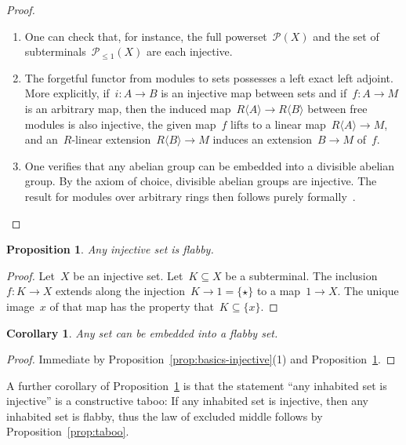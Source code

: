 \documentclass[oneside]{amsart}
\theoremstyle{definition}
\theoremstyle{plain}
\newtheorem{prop}[defn]{Proposition}
\newtheorem{cor}[defn]{Corollary}
\theoremstyle{remark}
\renewcommand{\P}{\mathcal{P}}
\renewcommand{\_}{\mathpunct{.}\,}
\begin{document}
\begin{proof}\begin{enumerate}
\item One can check that, for instance, the full powerset~$\P(X)$ and the set of
subterminals~$\P_{\leq 1}(X)$ are each injective.~\cite{XXX}
\item The forgetful functor from modules to sets possesses a left exact left
adjoint. More explicitly, if~$i : A \to B$ is an injective map between sets and
if~$f : A \to M$ is an arbitrary map, then the induced map~$R\langle A \rangle
\to R\langle B \rangle$ between free modules is also injective, the given
map~$f$ lifts to a linear map~$R\langle A \rangle \to M$, and an~$R$-linear
extension~$R\langle B \rangle \to M$ induces an extension~$B \to M$ of~$f$.
\item One verifies that any abelian group can be embedded into a divisible
abelian group. By the axiom of choice, divisible abelian groups are injective.
The result for modules over arbitrary rings then follows purely
formally~\cite{XXX}. \qedhere
\end{enumerate}\end{proof}

\begin{prop}\label{prop:injective-flabby}
Any injective set is flabby.\end{prop}

\begin{proof}Let~$X$ be an injective set. Let~$K \subseteq X$ be a subterminal.
The inclusion~$f : K \to X$ extends along the injection~$K \to 1 = \{\star\}$
to a map~$1 \to X$. The unique image~$x$ of that map has the property that~$K
\subseteq \{x\}$.\end{proof}

\begin{cor}\label{cor:enough-flabby-sets}
Any set can be embedded into a flabby set.\end{cor}

\begin{proof}Immediate by Proposition~\ref{prop:basics-injective}(1) and
Proposition~\ref{prop:injective-flabby}.\end{proof}

A further corollary of Proposition~\ref{prop:injective-flabby} is that the
statement ``any inhabited set is injective'' is a constructive taboo: If any
inhabited set is injective, then any inhabited set is flabby, thus the law of
excluded middle follows by Proposition~\ref{prop:taboo}.
\end{document}
